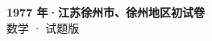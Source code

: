 \documentclass[zihao=-4, a4paper]{ctexart}
\begin{document}
\begin{center}
  {\Large\bfseries 1977 年·江苏徐州市、徐州地区初试卷}\\[4pt]
  {\large 数学 · 试题版}
\end{center}
\medskip
{}

\end{document}
